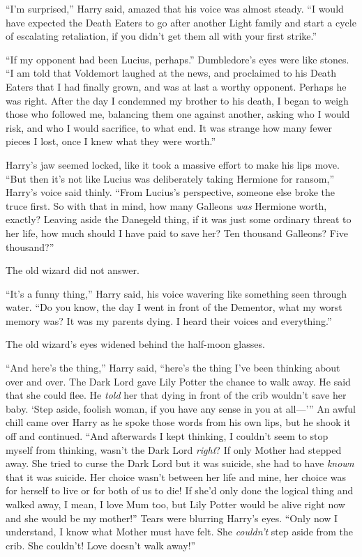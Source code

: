 “I’m surprised,” Harry said, amazed that his voice was almost steady. “I would have expected the Death Eaters to go after another Light family and start a cycle of escalating retaliation, if you didn’t get them all with your first strike.”

“If my opponent had been Lucius, perhaps.” Dumbledore’s eyes were like stones. “I am told that Voldemort laughed at the news, and proclaimed to his Death Eaters that I had finally grown, and was at last a worthy opponent. Perhaps he was right. After the day I condemned my brother to his death, I began to weigh those who followed me, balancing them one against another, asking who I would risk, and who I would sacrifice, to what end. It was strange how many fewer pieces I lost, once I knew what they were worth.”

Harry’s jaw seemed locked, like it took a massive effort to make his lips move. “But then it’s not like Lucius was deliberately taking Hermione for ransom,” Harry’s voice said thinly. “From Lucius’s perspective, someone else broke the truce first. So with that in mind, how many Galleons \emph{was} Hermione worth, exactly? Leaving aside the Danegeld thing, if it was just some ordinary threat to her life, how much should I have paid to save her? Ten thousand Galleons? Five thousand?”

The old wizard did not answer.

“It’s a funny thing,” Harry said, his voice wavering like something seen through water. “Do you know, the day I went in front of the Dementor, what my worst memory was? It was my parents dying. I heard their voices and everything.”

The old wizard’s eyes widened behind the half-moon glasses.

“And here’s the thing,” Harry said, “here’s the thing I’ve been thinking about over and over. The Dark Lord gave Lily Potter the chance to walk away. He said that she could flee. He \emph{told} her that dying in front of the crib wouldn’t save her baby. ‘Step aside, foolish woman, if you have any sense in you at all—’{}” An awful chill came over Harry as he spoke those words from his own lips, but he shook it off and continued. “And afterwards I kept thinking, I couldn’t seem to stop myself from thinking, wasn’t the Dark Lord \emph{right}? If only Mother had stepped away. She tried to curse the Dark Lord but it was suicide, she had to have \emph{known} that it was suicide. Her choice wasn’t between her life and mine, her choice was for herself to live or for both of us to die! If she’d only done the logical thing and walked away, I mean, I love Mum too, but Lily Potter would be alive right now and she would be my mother!” Tears were blurring Harry’s eyes. “Only now I understand, I know what Mother must have felt. She \emph{couldn’t} step aside from the crib. She couldn’t! Love doesn’t walk away!”

